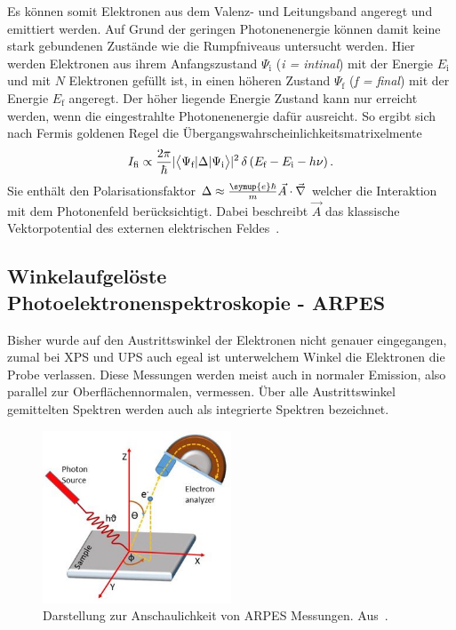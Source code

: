             Es können somit Elektronen aus dem Valenz- und Leitungsband angeregt und emittiert werden. 
            Auf Grund der geringen Photonenenergie können damit keine stark gebundenen Zustände wie die Rumpfniveaus untersucht werden.
            Hier werden Elektronen aus ihrem Anfangszustand $\Psi_\text{i}$ (\textit{i = intinal}) mit der Energie $E_\text{i}$ und mit $N$ Elektronen gefüllt ist, in einen höheren Zustand $\Psi_\text{f}$ (\textit{f = final}) mit der Energie $E_\text{f}$  angeregt.
            Der höher liegende Energie Zustand kann nur erreicht werden, wenn die eingestrahlte Photonenenergie dafür ausreicht.
            So ergibt sich nach Fermis goldenen Regel die Übergangswahrscheinlichkeitsmatrixelmente
            \begin{equation}
                I_\text{fi} \propto \frac{2\pi}{\hbar} \lvert\bigl<\Psi_\text{f}|\Delta|\Psi_\text{i}\bigr>\rvert^2 \, \delta\left(E_\text{f}-E_\text{i}-h\nu\right).
                \label{eqn:Fermi_gold}
            \end{equation}
            Sie enthält den Polarisationsfaktor $\Delta \approx \frac{\symup{e}\hbar}{m}\vec{A}\cdot\vec{\nabla}$ welcher die Interaktion mit dem Photonenfeld berücksichtigt.
            Dabei beschreibt $\vec{A}$ das klassische Vektorpotential des externen elektrischen Feldes~\cite{cao_theory_2010}.


        \subsection{Winkelaufgelöste Photoelektronenspektroskopie - ARPES} \label{sec:UPS}
            Bisher wurde  auf den Austrittswinkel der Elektronen nicht genauer eingegangen, zumal bei XPS und UPS auch egeal ist unterwelchem Winkel die Elektronen die Probe verlassen.
            Diese Messungen werden meist auch in normaler Emission, also parallel zur Oberflächennormalen, vermessen.
            Über alle Austrittswinkel gemittelten Spektren werden auch als integrierte Spektren bezeichnet.
            \begin{figure}
                \centering
                \includegraphics[width=0.5\textwidth]{./content/ARPES}
                \caption{Darstellung zur Anschaulichkeit von ARPES Messungen. Aus~\cite{ARPES}.}
                \label{fig:ARPES}
            \end{figure}

